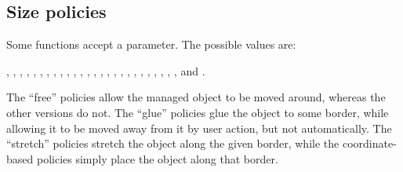 
\subsection{Size policies}
\label{sec:sizepolicies}

Some functions accept a  parameter. The possible
values are: 

\begin{flushleft}
,
,
,
,
,
,
,
,
,
,
,
,
,
,
,
,
,
,
,
,
,
,
,
,
,
, and
.
\end{flushleft}

The ``free'' policies allow the managed
object to be moved around, whereas the other versions do not. 
The ``glue'' policies glue the object to some border, while allowing
it to be moved away from it by user action, but not automatically.
The ``stretch'' policies stretch the object along the given border,
while the coordinate-based policies simply place the object along 
that border.
